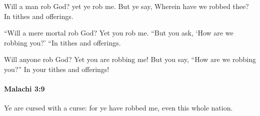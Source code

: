			\begin{versebox}
					\item[BHS] 
					\item[LXX] 
					\item[ASV] Will a man rob God? yet ye rob me. But ye say, Wherein have we robbed thee? In tithes and offerings.
					\item[NIV] “Will a mere mortal rob God? Yet you rob me. “But you ask, ‘How are we robbing you?’ “In tithes and offerings.
					\item[NRSV] Will anyone rob God? Yet you are robbing me! But you say, “How are we robbing you?” In your tithes and offerings!
			\end{versebox}

		\paragraph{Malachi 3:9} %
			\label{MALACHI-3-9}

			Ye are cursed with a curse: for ye have robbed me, even this whole nation.

